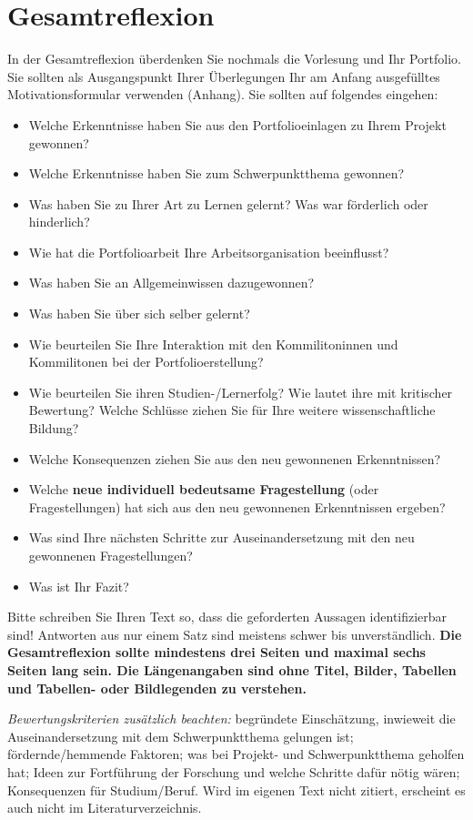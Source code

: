\chapter{Gesamtreflexion}
\label{chap:gesamtreflexion}

\begin{hinweise}
In der Gesamtreflexion \cite{DK2008} überdenken Sie nochmals die Vorlesung und Ihr Portfolio. Sie sollten als
Ausgangspunkt Ihrer Überlegungen Ihr am Anfang ausgefülltes Motivationsformular verwenden (Anhang). Sie sollten
auf folgendes eingehen:
\begin{itemize}\itemsep0pt
\item Welche Erkenntnisse haben Sie aus den Portfolioeinlagen zu Ihrem Projekt gewonnen?
\item Welche Erkenntnisse haben Sie zum Schwerpunktthema gewonnen?
\item Was haben Sie zu Ihrer Art zu Lernen gelernt? Was war förderlich oder hinderlich?
\item Wie hat die Portfolioarbeit Ihre Arbeitsorganisation beeinflusst?
\item Was haben Sie an Allgemeinwissen dazugewonnen?
\item Was haben Sie über sich selber gelernt?
\item Wie beurteilen Sie Ihre Interaktion mit den Kommilitoninnen und Kommilitonen bei der Portfolioerstellung?
\item Wie beurteilen Sie ihren Studien-/Lernerfolg? Wie lautet ihre mit kritischer Bewertung? Welche Schlüsse ziehen Sie für Ihre weitere wissenschaftliche Bildung?
\item Welche Konsequenzen ziehen Sie aus den neu gewonnenen Erkenntnissen?
\item Welche \textbf{neue individuell bedeutsame Fragestellung} (oder Fragestellungen) hat sich aus den neu gewonnenen Erkenntnissen ergeben?
\item Was sind Ihre nächsten Schritte zur Auseinandersetzung mit den neu gewonnenen Fragestellungen?
\item Was ist Ihr Fazit?
\end{itemize}
Bitte schreiben Sie Ihren Text so, dass die geforderten Aussagen identifizierbar sind! Antworten aus nur einem
Satz sind meistens schwer bis unverständlich.
\textbf{Die Gesamtreflexion sollte mindestens drei Seiten und maximal sechs Seiten lang sein. Die Längenangaben
sind ohne Titel, Bilder, Tabellen und Tabellen- oder Bildlegenden zu verstehen.}

\smallskip\emph{Bewertungskriterien zusätzlich beachten:} begründete Einschätzung, inwieweit die
Auseinandersetzung mit dem Schwerpunktthema gelungen ist; fördernde/hemmende Faktoren; was bei Projekt- und
Schwerpunktthema geholfen hat; Ideen zur Fortführung der Forschung und welche Schritte dafür nötig wären;
Konsequenzen für Studium/Beruf. Wird \cite{DK2008} im eigenen Text nicht zitiert, erscheint es auch nicht im
Literaturverzeichnis.
\end{hinweise}

